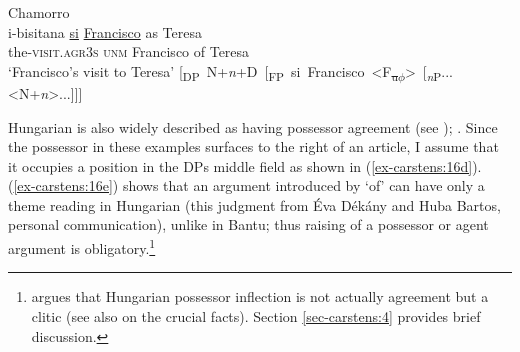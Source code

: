 \documentclass[output=paper
,modfonts
,nonflat]{langsci/langscibook}
\begin{document}
\begin{exe}
	\ex Chamorro \label{ex-carstens:15}
	\xlist
	\ex \citep[127]{Chung1982}\label{ex-carstens:15a}\\
	\gll i-bisitana       \uline{si} \uline{Francisco}   as Teresa \\
	the-\textsc{visit.agr3s}     \textsc{unm} Francisco           of Teresa\\
	\glt `Francisco's visit to Teresa'  	
	\ex \mbox{[\textsubscript{DP} N+\textit{n}+D [\textsubscript{FP} si Francisco  <F\textsubscript{\sout{u}}\textsubscript{\sout{$\phi$}}> [\textsubscript{\textit{n}P}...<N+\textit{n}>...]]]}
	\endxlist
\end{exe}
Hungarian is also widely described as having possessor agreement (see \citealt{Szabolcsi1983, Szabolcsi1994}); . Since the possessor in these examples surfaces to the right of an article, I assume that it occupies a position in the DP\textquotesingle s middle field as shown in (\ref{ex-carstens:16d}). (\ref{ex-carstens:16e}) shows that an argument introduced by `of' can have only a theme reading in Hungarian (this judgment from Éva Dékány and Huba Bartos, personal communication), unlike in Bantu; thus raising of a possessor or agent argument is obligatory.\footnote{\label{note9} argues that Hungarian possessor inflection is not actually agreement but a clitic (see also \citealt{Den_Dikken1999,Bartos1999,Kiss2002} on the crucial facts). Section \ref{sec-carstens:4} provides brief discussion.} 
\end{document}
